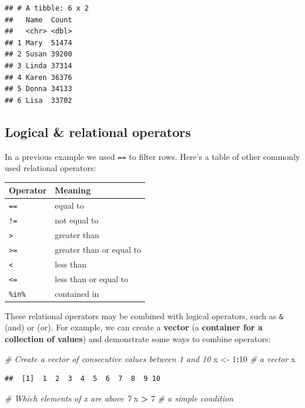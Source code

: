 \documentclass[]{book}
\newenvironment{Shaded}{\begin{snugshade}}{\end{snugshade}}
\newcommand{\CommentTok}[1]{\textcolor[rgb]{0.56,0.35,0.01}{\textit{#1}}}
\newcommand{\DecValTok}[1]{\textcolor[rgb]{0.00,0.00,0.81}{#1}}
\newcommand{\NormalTok}[1]{#1}
\newcommand{\OperatorTok}[1]{\textcolor[rgb]{0.81,0.36,0.00}{\textbf{#1}}}
\newcommand{\StringTok}[1]{\textcolor[rgb]{0.31,0.60,0.02}{#1}}
\begin{document}
\begin{verbatim}
## # A tibble: 6 x 2
##   Name  Count
##   <chr> <dbl>
## 1 Mary  51474
## 2 Susan 39200
## 3 Linda 37314
## 4 Karen 36376
## 5 Donna 34133
## 6 Lisa  33702
\end{verbatim}

\hypertarget{logical-relational-operators}{%
\subsection{Logical \& relational operators}\label{logical-relational-operators}}

In a previous example we used \texttt{==} to filter rows.
Here's a table of other commonly used relational operators:

\begin{longtable}[]{@{}ll@{}}
\toprule
Operator & Meaning\tabularnewline
\midrule
\endhead
\texttt{==} & equal to\tabularnewline
\texttt{!=} & not equal to\tabularnewline
\texttt{\textgreater{}} & greater than\tabularnewline
\texttt{\textgreater{}=} & greater than or equal to\tabularnewline
\texttt{\textless{}} & less than\tabularnewline
\texttt{\textless{}=} & less than or equal to\tabularnewline
\texttt{\%in\%} & contained in\tabularnewline
\bottomrule
\end{longtable}

These relational operators may be combined with logical operators, such as \texttt{\&} (and) or \texttt{\textbar{}} (or).
For example, we can create a \textbf{vector} (a \textbf{container for a collection of values}) and demonstrate
some ways to combine operators:

\begin{Shaded}
\begin{Highlighting}[]
\CommentTok{# Create a vector of consecutive values between 1 and 10}
\NormalTok{x <-}\StringTok{ }\DecValTok{1}\OperatorTok{:}\DecValTok{10} \CommentTok{# a vector}
\NormalTok{x}
\end{Highlighting}
\end{Shaded}

\begin{verbatim}
##  [1]  1  2  3  4  5  6  7  8  9 10
\end{verbatim}

\begin{Shaded}
\begin{Highlighting}[]
\CommentTok{# Which elements of x are above 7}
\NormalTok{x }\OperatorTok{>}\StringTok{ }\DecValTok{7} \CommentTok{# a simple condition}
\end{Highlighting}
\end{Shaded}
\end{document}
